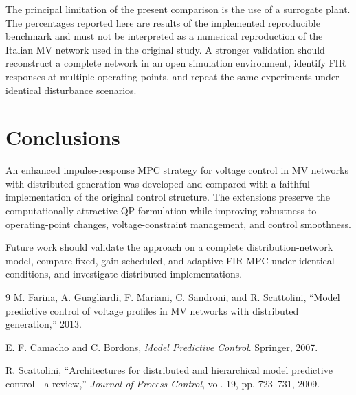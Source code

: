 \documentclass[10pt,twocolumn]{article}
\begin{document}
The principal limitation of the present comparison is the use of a surrogate plant. The percentages reported here are results of the implemented reproducible benchmark and must not be interpreted as a numerical reproduction of the Italian MV network used in the original study. A stronger validation should reconstruct a complete network in an open simulation environment, identify FIR responses at multiple operating points, and repeat the same experiments under identical disturbance scenarios.

\section{Conclusions}
An enhanced impulse-response MPC strategy for voltage control in MV networks with distributed generation was developed and compared with a faithful implementation of the original control structure. The extensions preserve the computationally attractive QP formulation while improving robustness to operating-point changes, voltage-constraint management, and control smoothness.

Future work should validate the approach on a complete distribution-network model, compare fixed, gain-scheduled, and adaptive FIR MPC under identical conditions, and investigate distributed implementations.

\begin{thebibliography}{9}
M. Farina, A. Guagliardi, F. Mariani, C. Sandroni, and R. Scattolini,
``Model predictive control of voltage profiles in MV networks with distributed generation,'' 2013.

E. F. Camacho and C. Bordons,
\emph{Model Predictive Control}. Springer, 2007.

R. Scattolini,
``Architectures for distributed and hierarchical model predictive control---a review,''
\emph{Journal of Process Control}, vol. 19, pp. 723--731, 2009.
\end{thebibliography}
\end{document}
